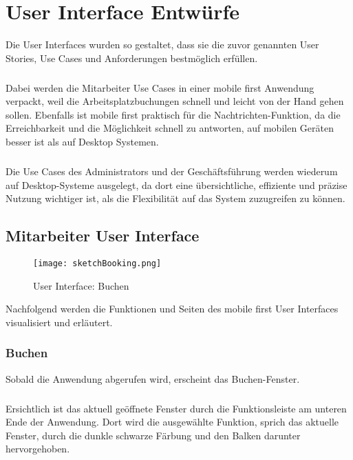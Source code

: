 \chapter{User Interface Entwürfe}

Die User Interfaces wurden so gestaltet, dass sie die zuvor genannten User Stories, Use Cases und Anforderungen bestmöglich erfüllen. 
\paragraph{}Dabei werden die Mitarbeiter Use Cases in einer mobile first Anwendung verpackt, weil die Arbeitsplatzbuchungen schnell und leicht von der Hand gehen sollen.
Ebenfalls ist mobile first praktisch für die Nachtrichten-Funktion, da die Erreichbarkeit und die Möglichkeit schnell zu antworten, auf mobilen Geräten besser ist als auf Desktop Systemen. 
\paragraph{}Die Use Cases des Administrators und der Geschäftsführung werden wiederum auf Desktop-Systeme ausgelegt, da dort eine übersichtliche, effiziente und präzise Nutzung wichtiger ist, als die Flexibilität auf das System zuzugreifen zu können. 

\newpage

\section{Mitarbeiter User Interface}

\begin{wrapfigure}[18]{r}{5.5cm}
  \texttt{[image: sketchBooking.png]}
  \caption{User Interface: Buchen}
\end{wrapfigure}

Nachfolgend werden die Funktionen und Seiten des mobile first User Interfaces visualisiert und erläutert. 

\subsection{Buchen}

Sobald die Anwendung abgerufen wird, erscheint das Buchen-Fenster.
\paragraph{}Ersichtlich ist das aktuell geöffnete Fenster durch die Funktionsleiste am unteren Ende der Anwendung. 
Dort wird die ausgewählte Funktion, sprich das aktuelle Fenster, durch die dunkle schwarze Färbung und den Balken darunter hervorgehoben.
